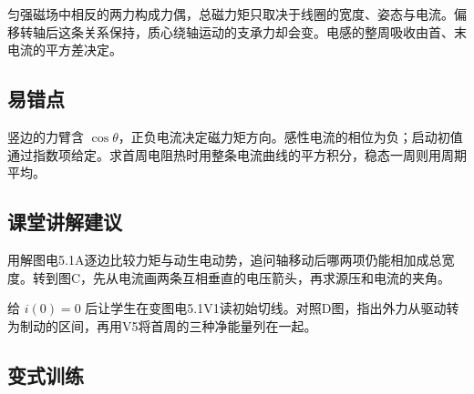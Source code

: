 \documentclass[UTF8,fontset=fandol,a4paper,11pt]{ctexart}
\begin{document}
匀强磁场中相反的两力构成力偶，总磁力矩只取决于线圈的宽度、姿态与电流。偏移转轴后这条关系保持，质心绕轴运动的支承力却会变。电感的整周吸收由首、末电流的平方差决定。



\subsection*{易错点}

竖边的力臂含 $\cos\theta$，正负电流决定磁力矩方向。感性电流的相位为负；启动初值通过指数项给定。求首周电阻热时用整条电流曲线的平方积分，稳态一周则用周期平均。



\subsection*{课堂讲解建议}

用解图电5.1A逐边比较力矩与动生电动势，追问轴移动后哪两项仍能相加成总宽度。转到图C，先从电流画两条互相垂直的电压箭头，再求源压和电流的夹角。

给 $i(0)=0$ 后让学生在变图电5.1V1读初始切线。对照D图，指出外力从驱动转为制动的区间，再用V5将首周的三种净能量列在一起。


\subsection*{变式训练}
\end{document}
